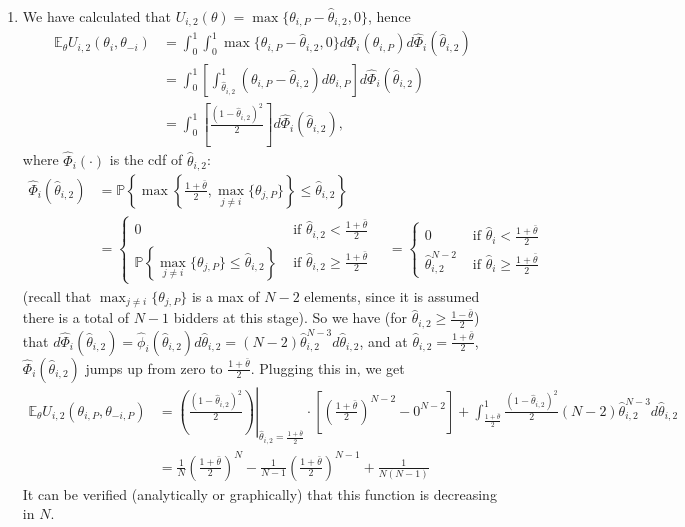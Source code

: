 \documentclass[a4paper]{article}
\begin{document}
\begin{enumerate}
		\item We have calculated that $U_{i,2}(\theta) = \max \{ \theta_{i,P} - \hat{\theta}_{i,2}, 0 \}$, hence
		\begin{align*}
			\mathbb{E}_\theta U_{i,2}(\theta_i,\theta_{-i}) &= \int_0^1 \int_0^1 \max \{ \theta_{i,P} - \hat{\theta}_{i,2}, 0 \} d \Phi_i(\theta_{i,P}) d \hat{\Phi}_i (\hat{\theta}_{i,2}) 
			\\
			&= \int_0^1 \left[ \int_{\hat{\theta}_{i,2}}^1 (\theta_{i,P} - \hat{\theta}_{i,2}) d\theta_{i,P} \right] d \hat{\Phi}_i (\hat{\theta}_{i,2}) 
			\\
			&= \int_0^1 \left[ \frac{(1-\hat{\theta}_{i,2})^2}{2} \right] d \hat{\Phi}_i (\hat{\theta}_{i,2}),
		\end{align*}
		where $\hat{\Phi}_i (\cdot)$ is the cdf of $\hat{\theta}_{i,2}$:
		\begin{align*}
			\hat{\Phi}_i (\hat{\theta}_{i,2}) &= \mathbb{P} \left\{ \max \left\{\frac{1+\bar{\theta}}{2}, \max_{j \neq i} \{ \theta_{j,P} \} \right\} \leq \hat{\theta}_{i,2} \right\}
			\\
			& = \begin{cases}
				0 & \text{ if } \hat{\theta}_{i,2} < \frac{1+\bar{\theta}}{2}
				\\
				\mathbb{P} \left\{ \max_{j \neq i} \{ \theta_{j,P} \} \leq \hat{\theta}_{i,2} \right\} & \text{ if } \hat{\theta}_{i,2} \geq \frac{1+\bar{\theta}}{2}
			\end{cases}
			\quad 
			= \begin{cases}
				0 & \text{ if } \hat{\theta}_i < \frac{1+\bar{\theta}}{2}
				\\
				\hat{\theta}_{i,2}^{N-2} & \text{ if } \hat{\theta}_i \geq \frac{1+\bar{\theta}}{2}
			\end{cases}
		\end{align*}
		(recall that $\max_{j \neq i} \{ \theta_{j,P} \}$ is a max of $N-2$ elements, since it is assumed there is a total of $N-1$ bidders at this stage). So we have (for $\hat{\theta}_{i,2} \geq \frac{1-\bar{\theta}}{2}$) that $d \hat{\Phi}_i (\hat{\theta}_{i,2}) = \hat{\phi}_i(\hat{\theta}_{i,2}) d \hat{\theta}_{i,2} = (N-2) \hat{\theta}_{i,2}^{N-3} d \hat{\theta}_{i,2}$, and at $\hat{\theta}_{i,2}=\frac{1+\bar{\theta}}{2}$, $\hat{\Phi}_i(\hat{\theta}_{i,2})$ jumps up from zero to $\frac{1+\bar{\theta}}{2}$. Plugging this in, we get
		\begin{align}
			\mathbb{E}_\theta U_{i,2}(\theta_{i,P},\theta_{-i,P}) &= \left.\left( \frac{(1-\hat{\theta}_{i,2})^2}{2} \right) \right|_{\hat{\theta}_{i,2}=\frac{1+\bar{\theta}}{2}} \cdot \left[ \left(\frac{1+\bar{\theta}}{2}\right)^{N-2} - 0^{N-2} \right]
			+ \int_{\frac{1+\bar{\theta}}{2}}^1 \frac{(1-\hat{\theta}_{i,2})^2}{2} (N-2) \hat{\theta}_{i,2}^{N-3} d \hat{\theta}_{i,2}
			\nonumber
			\\
			&= \frac{1}{N} \left(\frac{1+\bar{\theta}}{2}\right)^N - \frac{1}{N-1} \left(\frac{1+\bar{\theta}}{2}\right)^{N-1} + \frac{1}{N(N-1)}
			\label{eq:cars_utilt2}
		\end{align}
		It can be verified (analytically or graphically) that this function is decreasing in $N$.
		

\end{enumerate}
\end{document}

